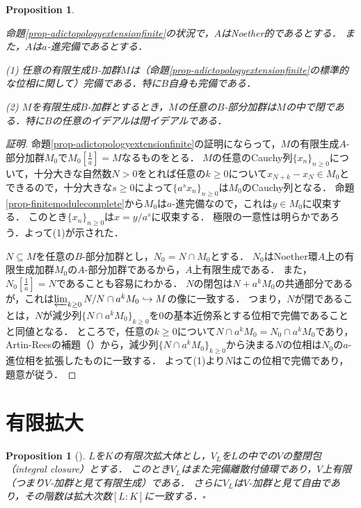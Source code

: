 \documentclass[a4paper,12pt, dvipdfmx]{jsbook}
\theoremstyle{plain}
\newtheorem{prop}[thm]{\bfseries Proposition}
\theoremstyle{definition}
\begin{document}
\begin{prop}\label{prop-adictopologyextensionfinitesubclosed}{\rm 
命題\ref{prop-adictopologyextensionfinite}の状況で，$A$はNoether的であるとする．
また，$A$は$a$-進完備であるとする．

(1) 任意の有限生成$B$-加群$M$は（命題\ref{prop-adictopologyextensionfinite}の標準的な位相に関して）完備である．特に$B$自身も完備である．

(2) $M$を有限生成$B$-加群とするとき，$M$の任意の$B$-部分加群は$M$の中で閉である．特に$B$の任意のイデアルは閉イデアルである．}
\end{prop}

\begin{proof}[証明]
命題\ref{prop-adictopologyextensionfinite}の証明にならって，$M$の有限生成$A$-部分加群$M_0$で$M_0[\frac{1}{a}]=M$なるものをとる．
$M$の任意のCauchy列$\{x_n\}_{n\geq 0}$について，十分大きな自然数$N>0$をとれば任意の$k\geq 0$について$x_{N+k}-x_N\in M_0$とできるので，十分大きな$s\geq 0$によって$\{a^sx_n\}_{n\geq 0}$は$M_0$のCauchy列となる．
命題\ref{prop-finitemodulecomplete}から$M_0$は$a$-進完備なので，これは$y\in M_0$に収束する．
このとき$\{x_n\}_{n\geq 0}$は$x=y/a^s$に収束する．
極限の一意性は明らかであろう．よって(1)が示された．

$N\subseteq M$を任意の$B$-部分加群とし，$N_0=N\cap M_0$とする．
$N_0$はNoether環$A$上の有限生成加群$M_0$の$A$-部分加群であるから，$A$上有限生成である．
また，$N_0[\frac{1}{a}]=N$であることも容易にわかる．
$N$の閉包は$N+a^kM_0$の共通部分であるが，これは$\varprojlim_{k\geq 0}N/N\cap a^kM_0\hookrightarrow M$の像に一致する．
つまり，$N$が閉であることは，$N$が減少列$\{N\cap a^kM_0\}_{k\geq 0}$を$0$の基本近傍系とする位相で完備であることと同値となる．
ところで，任意の$k\geq 0$について$N\cap a^kM_0=N_0\cap a^kM_0$であり，Artin-Reesの補題（\cite[Prop.\ 10.9]{AM}）から，減少列$\{N\cap a^kM_0\}_{k\geq 0}$から決まる$N$の位相は$N_0$の$a$-進位相を拡張したものに一致する．
よって(1)より$N$はこの位相で完備であり，題意が従う．
\end{proof}

\section{有限拡大}\label{sec-finiteextensions}
\begin{prop}[{\cite[Chap.\ II, \S2, Prop.\ 3]{Serr}}]\label{prop-DVRextension}{\rm 
$L$を$K$の有限次拡大体とし，$V_L$を$L$の中での$V$の整閉包（integral closure）とする．
このとき$V_L$はまた完備離散付値環であり，$V$上有限（つまり$V$-加群と見て有限生成）である．
さらに$V_L$は$V$-加群と見て自由であり，その階数は拡大次数$[L:K]$に一致する．}\hfill$\square$
\end{prop}
\end{document}

